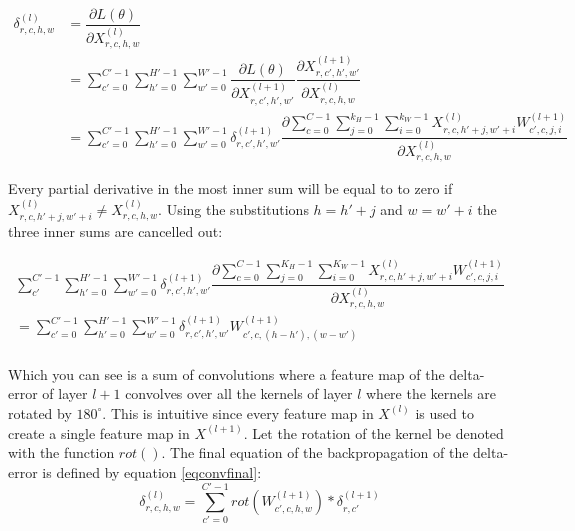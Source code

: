 \documentclass[a4paper, twoside]{article}
\newcommand*{\pd}[2]{\ensuremath{\dfrac{\partial #1}{\partial #2}}}
\begin{document}
\begin{equation}\label{konvolutionbackprop}
\begin{split}
	\delta^{(l)}_{r,c,h,w}
		& = \pd{L(\theta)}{X^{(l)}_{r,c,h,w}} \\
		& = \sum^{C'-1}_{c'=0} \sum^{H'-1}_{h'=0} \sum^{W'-1}_{w'=0} \pd{L(\theta)}{X^{(l+1)}_{r,c',h',w'}} \pd{X^{(l+1)}_{r,c',h',w'}}{X^{(l)}_{r,c,h,w}} \\
		& = \sum^{C'-1}_{c'=0} \sum^{H'-1}_{h'=0} \sum^{W'-1}_{w'=0} \delta^{(l+1)}_{r,c',h',w'} \pd{\sum^{C-1}_{c=0} \sum^{k_H-1}_{j=0} \sum^{k_W-1}_{i=0} X^{(l)}_{r, c, h'+j, w'+i}W^{(l+1)}_{c', c, j, i}}{X^{(l)}_{r,c,h,w}}
\end{split}
\end{equation}

Every partial derivative in the most inner sum will be equal to to zero if $X^{(l)}_{r, c, h'+j, w'+i} \neq X^{(l)}_{r,c,h,w}$. Using the substitutions $h = h'+j$ and $w = w'+i$ the three inner sums are cancelled out: \cite{webconv1} \cite{webconv2} \cite{webconv3}

\begin{multline}
\sum^{C'-1}_{c'} \sum^{H'-1}_{h'=0} \sum^{W'-1}_{w'=0} \delta^{(l+1)}_{r,c',h',w'} \pd{\sum^{C-1}_{c=0} \sum^{K_H-1}_{j=0} \sum^{K_W-1}_{i=0} X^{(l)}_{r, c, h'+j, w'+i}W^{(l+1)}_{c', c, j, i}}{X^{(l)}_{r,c,h,w}} \\
	 = \sum^{C'-1}_{c'=0} \sum^{H'-1}_{h'=0} \sum^{W'-1}_{w'=0} \delta^{(l+1)}_{r,c',h',w'} W^{(l+1)}_{c', c, (h-h'), (w-w')}     \\
\end{multline}

Which you can see is a sum of convolutions where a feature map of the delta-error of layer $l+1$ convolves over all the kernels of layer $l$ where the kernels are rotated by $180^\circ$. This is intuitive since every feature map in $X^{(l)}$ is used to create a single feature map in $X^{(l+1)}$. Let the rotation of the kernel be denoted with the function $rot()$. The final equation of the backpropagation of the delta-error is defined by equation \eqref{eqconvfinal}: \cite{webconv1} \cite{webconv2} \cite{webconv3}
\begin{equation}\label{eqconvfinal}
\delta^{(l)}_{r,c,h,w} = \sum^{C'-1}_{c'=0} rot(W^{(l+1)}_{c',c,h,w}) * \delta^{(l+1)}_{r,c'}
\end{equation}
\end{document}
